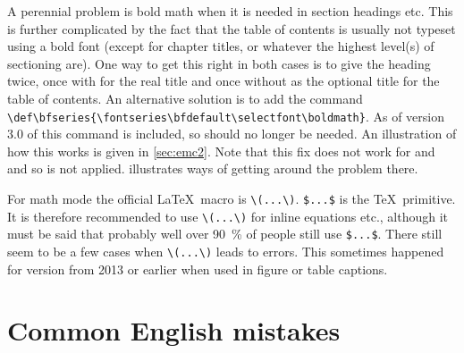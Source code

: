 A perennial problem is bold math when it is needed in
section headings etc. This is further complicated by the fact that the
table of contents is usually not typeset using a bold font (except for
chapter titles, or whatever the highest level(s) of sectioning are). %
One way to get this right in both cases is to give the
heading twice, once with  for the real title and once
without as the optional title for the table of contents.
An alternative solution is to add the command\\
\verb|\def\bfseries{\fontseries\bfdefault\selectfont\boldmath}|.
As of version 3.0 of  this command is included,
so  should no longer be needed.
An illustration of how this works is given in \cref{sec:emc2}.
Note that this fix does not work for \LuaLaTeX and \XeLaTeX and so is not applied.
 illustrates ways of getting around the problem there.

For math mode the official \LaTeX\ macro is \verb|\(...\)|.
\verb|$...$| is the \TeX\ primitive.
It is therefore recommended to use \verb|\(...\)| for inline equations etc.,
although it must be said that probably well over \SI{90}{\%} of people still use \verb|$...$|.
There still seem to be a few cases when \verb|\(...\)| leads to errors.
This sometimes happened for \TeXLive version from 2013 or earlier
when used in figure or table captions.


\section{Common English mistakes}%
\label{sec:tips:english}

